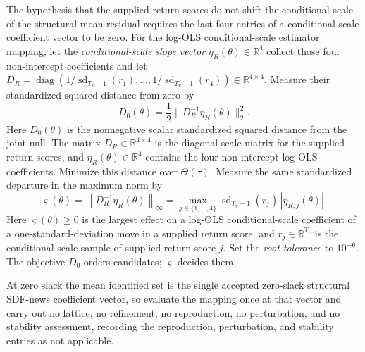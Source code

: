 \documentclass[11pt]{article}
\begin{document}
The hypothesis that the supplied return scores do not shift the conditional scale of the structural
mean residual requires the last four entries of a conditional-scale coefficient vector to be zero. For the log-OLS conditional-scale estimator mapping, let
the \emph{conditional-scale slope vector} \(\eta_R(\theta)\in\mathbb R^4\) collect those four non-intercept coefficients and let
\(D_R=\operatorname{diag}(1/\operatorname{sd}_{T_v-1}(r_1),\ldots,
1/\operatorname{sd}_{T_v-1}(r_4))\in\mathbb R^{4\times4}\). Measure their standardized squared
distance from zero by
\begin{equation*}
 D_0(\theta)=\frac12\|D_R^{-1}\eta_R(\theta)\|_2^2.
\end{equation*}
Here \(D_0(\theta)\) is the nonnegative scalar standardized squared distance from the joint null.
The matrix \(D_R\in\mathbb R^{4\times4}\) is the diagonal scale matrix for the supplied return
scores, and \(\eta_R(\theta)\in\mathbb R^4\) contains the four non-intercept log-OLS coefficients. Minimize this
distance over \(\Theta(\tau)\). Measure the same standardized departure in the maximum norm by
\begin{equation*}
 \varsigma(\theta)=\left\|D_R^{-1}\eta_R(\theta)\right\|_\infty
 =\max_{j\in\{1,\ldots,4\}}\operatorname{sd}_{T_v-1}(r_j)\,\left|\eta_{R,j}(\theta)\right|.
\end{equation*}
Here \(\varsigma(\theta)\ge0\) is the largest effect on a log-OLS conditional-scale coefficient of a
one-standard-deviation move in a supplied return score, and \(r_j\in\mathbb R^{T_v}\) is the
conditional-scale sample of supplied return score \(j\). Set the \emph{root tolerance} to
\(10^{-6}\). The objective \(D_0\) orders candidates; \(\varsigma\) decides them.

At zero slack the mean identified set is the single accepted zero-slack structural SDF-news
coefficient vector, so evaluate the mapping once at that vector and carry out no lattice, no
refinement, no reproduction, no perturbation, and no stability assessment, recording the
reproduction, perturbation, and stability entries as not applicable.
\end{document}
